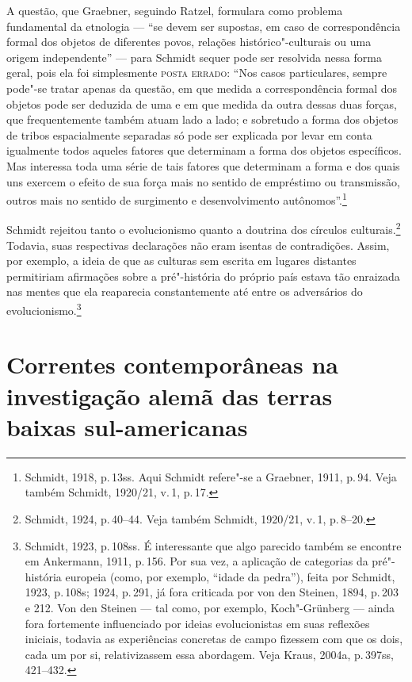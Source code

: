 A questão, que Graebner, seguindo Ratzel, formulara como problema
fundamental da etnologia --- ``se devem ser supostas, em caso de
correspondência formal dos objetos de diferentes povos, relações
histórico"-culturais ou uma origem independente'' --- para Schmidt sequer
pode ser resolvida nessa forma geral, pois ela foi simplesmente \textsc{posta
errado}: ``Nos casos particulares, sempre pode"-se tratar apenas da
questão, em que medida a correspondência formal dos objetos pode ser
deduzida de uma e em que medida da outra dessas duas forças, que
frequentemente também atuam lado a lado; e sobretudo a forma dos objetos
de tribos espacialmente separadas só pode ser explicada por levar em
conta igualmente todos aqueles fatores que determinam a forma dos
objetos específicos. Mas interessa toda uma série de tais fatores que
determinam a forma e dos quais uns exercem o efeito de sua força mais no
sentido de empréstimo ou transmissão, outros mais no sentido de
surgimento e desenvolvimento autônomos''.\footnote{Schmidt, 1918, p.\,13ss. Aqui Schmidt refere"-se a Graebner, 1911, p.\,94. Veja também
  Schmidt, 1920/21, v.\,1, p.\,17.}

Schmidt rejeitou tanto o evolucionismo quanto a doutrina dos círculos
culturais.\footnote{Schmidt, 1924, p.\,40--44. Veja também Schmidt,
  1920/21, v.\,1, p.\,8--20.} Todavia, suas respectivas declarações não
eram isentas de contradições. Assim, por exemplo, a ideia de que as
culturas sem escrita em lugares distantes permitiriam afirmações sobre a
pré"-história do próprio país estava tão enraizada nas mentes que ela
reaparecia constantemente até entre os adversários do
evolucionismo.\footnote{Schmidt, 1923, p.\,108ss. É interessante que
  algo parecido também se encontre em Ankermann, 1911, p.\,156. Por sua
  vez, a aplicação de categorias da pré"-história europeia (como, por
  exemplo, ``idade da pedra''), feita por Schmidt, 1923, p.\,108s; 1924,
  p.\,291, já fora criticada por von den Steinen, 1894, p.\,203 e 212.
  Von den Steinen --- tal como, por exemplo, Koch"-Grünberg --- ainda fora
  fortemente influenciado por ideias evolucionistas em suas reflexões
  iniciais, todavia as experiências concretas de campo fizessem com que
  os dois, cada um por si, relativizassem essa abordagem. Veja Kraus,
  2004a, p.\,397ss, 421--432.}

\section{Correntes contemporâneas na investigação alemã das terras baixas sul-americanas}

